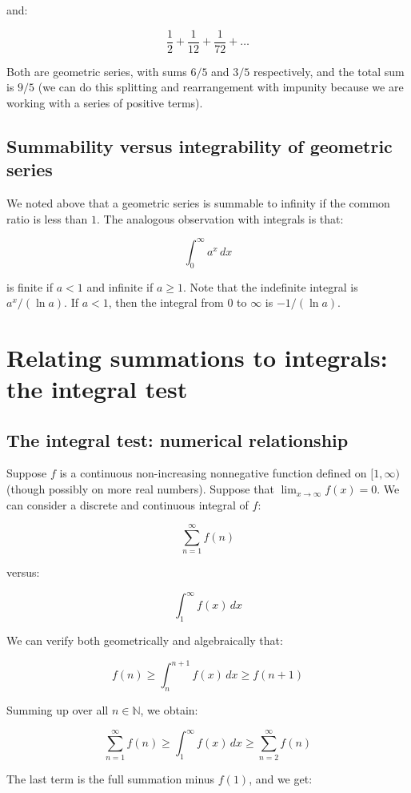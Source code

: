 \documentclass{amsart}
\begin{document}
and:

$$\frac{1}{2} + \frac{1}{12} + \frac{1}{72} + \dots$$

Both are geometric series, with sums $6/5$ and $3/5$ respectively, and
the total sum is $9/5$ (we can do this splitting and rearrangement
with impunity because we are working with a series of positive terms).

\subsection{Summability versus integrability of geometric series}

We noted above that a geometric series is summable to infinity if the
common ratio is less than $1$. The analogous observation with
integrals is that:

$$\int_0^\infty a^x \, dx$$

is finite if $a < 1$ and infinite if $a \ge 1$. Note that the
indefinite integral is $a^x/(\ln a)$. If $a < 1$, then the integral
from $0$ to $\infty$ is $-1/(\ln a)$.

\section{Relating summations to integrals: the integral test}

\subsection{The integral test: numerical relationship}

Suppose $f$ is a continuous non-increasing nonnegative function defined on
$[1,\infty)$ (though possibly on more real numbers). Suppose that
$\lim_{x \to \infty} f(x) = 0$. We can consider a discrete and
continuous integral of $f$:

$$\sum_{n=1}^\infty f(n)$$

versus:

$$\int_1^\infty f(x) \, dx$$

We can verify both geometrically and algebraically that:

$$f(n) \ge \int_n^{n+1} f(x) \, dx \ge f(n + 1)$$

Summing up over all $n \in \mathbb{N}$, we obtain:

$$\sum_{n=1}^\infty f(n) \ge \int_1^\infty f(x) \, dx \ge \sum_{n=2}^\infty f(n)$$

The last term is the full summation minus $f(1)$, and we get:
\end{document}
